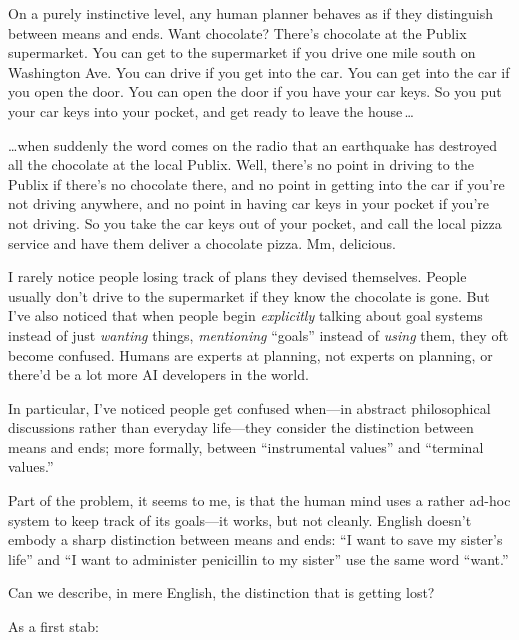 {\myendsectiontext


\bigskip


{
 On a purely instinctive level, any human planner behaves as if
they distinguish between means and ends. Want chocolate?
There's chocolate at the Publix supermarket. You can
get to the supermarket if you drive one mile south on Washington Ave.
You can drive if you get into the car. You can get into the car if you
open the door. You can open the door if you have your car keys. So you
put your car keys into your pocket, and get ready to leave the house\,\ldots }

{
 \ldots when suddenly the word comes on the radio that an earthquake
has destroyed all the chocolate at the local Publix. Well,
there's no point in driving to the Publix if
there's no chocolate there, and no point in getting
into the car if you're not driving anywhere, and no
point in having car keys in your pocket if you're not
driving. So you take the car keys out of your pocket, and call the
local pizza service and have them deliver a chocolate pizza. Mm,
delicious.}

{
 I rarely notice people losing track of plans they devised
themselves. People usually don't drive to the
supermarket if they know the chocolate is gone. But
I've also noticed that when people begin
\textit{explicitly} talking about goal systems instead of just
\textit{wanting} things, \textit{mentioning}
``goals'' instead of \textit{using}
them, they oft become confused. Humans are experts at planning, not
experts on planning, or there'd be a lot more AI
developers in the world.}

{
 In particular, I've noticed people get confused
when---in abstract philosophical discussions rather than everyday
life---they consider the distinction between means and ends; more
formally, between ``instrumental
values'' and ``terminal
values.''}

{
 Part of the problem, it seems to me, is that the human mind uses a
rather ad-hoc system to keep track of its goals---it works, but not
cleanly. English doesn't embody a sharp distinction
between means and ends: ``I want to save my
sister's life'' and
``I want to administer penicillin to my
sister'' use the same word
``want.''}

{
 Can we describe, in mere English, the distinction that is getting
lost?}

{
 As a first stab:}

}
